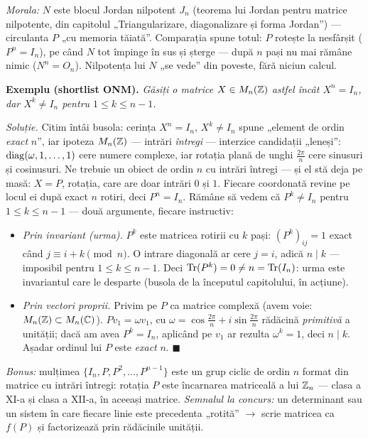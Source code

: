 \emph{Morala:} $N$ este blocul Jordan nilpotent $J_n$ (teorema lui Jordan pentru matrice nilpotente, din capitolul „Triangularizare, diagonalizare și forma Jordan'') --- circulanta $P$ „cu memoria tăiată''. Comparația spune totul: $P$ rotește la nesfârșit ($P^n=I_n$), pe când $N$ tot împinge în sus și șterge --- după $n$ pași nu mai rămâne nimic ($N^n=O_n$). Nilpotența lui $N$ „se vede'' din poveste, fără niciun calcul.

\textbf{Exemplu (shortlist ONM).} \emph{Găsiți o matrice $X\in M_n(\mathbb{Z})$ astfel încât $X^n=I_n$, dar $X^k\neq I_n$ pentru $1\le k\le n-1$.}

\emph{Soluție.} Citim întâi busola: cerința $X^n=I_n$, $X^k\neq I_n$ spune „element de ordin \emph{exact} $n$'', iar ipoteza $M_n(\mathbb{Z})$ --- intrări \emph{întregi} --- interzice candidații „leneși'': $\operatorname{diag}(\omega,1,\dots,1)$ cere numere complexe, iar rotația plană de unghi $\frac{2\pi}n$ cere sinusuri și cosinusuri. Ne trebuie un obiect de ordin $n$ cu intrări întregi --- și el stă deja pe masă: $X=P$, rotația, care are doar intrări $0$ și $1$. Fiecare coordonată revine pe locul ei după exact $n$ rotiri, deci $P^n=I_n$. Rămâne să vedem că $P^k\neq I_n$ pentru $1\le k\le n-1$ --- două argumente, fiecare instructiv:
\begin{itemize}[leftmargin=*, itemsep=1pt]
\item \emph{Prin invariant (urma).} $P^k$ este matricea rotirii cu $k$ pași: $(P^k)_{ij}=1$ exact când $j\equiv i+k\pmod n$. O intrare diagonală ar cere $j=i$, adică $n\mid k$ --- imposibil pentru $1\le k\le n-1$. Deci $\operatorname{Tr}(P^k)=0\neq n=\operatorname{Tr}(I_n)$: urma este invariantul care le desparte (busola de la începutul capitolului, în acțiune).
\item \emph{Prin vectori proprii.} Privim pe $P$ ca matrice complexă (avem voie: $M_n(\mathbb{Z})\subset M_n(\mathbb{C})$). $Pv_1=\omega v_1$, cu $\omega=\cos\frac{2\pi}n+i\sin\frac{2\pi}n$ rădăcină \emph{primitivă} a unității; dacă am avea $P^k=I_n$, aplicând pe $v_1$ ar rezulta $\omega^k=1$, deci $n\mid k$. Așadar ordinul lui $P$ este \emph{exact} $n$. $\blacksquare$
\end{itemize}

\emph{Bonus:} mulțimea $\{I_n,P,P^2,\dots,P^{n-1}\}$ este un grup ciclic de ordin $n$ format din matrice cu intrări întregi: rotația $P$ este încarnarea matriceală a lui $\mathbb{Z}_n$ --- clasa a XI-a și clasa a XII-a, în aceeași matrice. \emph{Semnalul la concurs:} un determinant sau un sistem în care fiecare linie este precedenta „rotită'' $\to$ scrie matricea ca $f(P)$ și factorizează prin rădăcinile unității.

